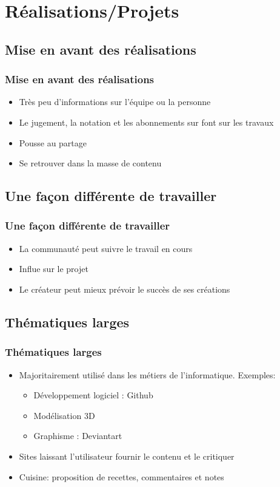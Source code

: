     \section{Réalisations/Projets}

\subsection{Mise en avant des réalisations}
\begin{frame}
\frametitle{Mise en avant des réalisations}
\begin{itemize}
    \itemsep1.5em
    \item Très peu d'informations sur l'équipe ou la personne
    \item Le jugement, la notation et les abonnements sur font sur les travaux
    \item Pousse au partage
    \item Se retrouver dans la masse de contenu
\end{itemize}
\end{frame}

\subsection{Une façon différente de travailler}
\begin{frame}
\frametitle{Une façon différente de travailler}
\begin{itemize}
    \itemsep2em
    \item La communauté peut suivre le travail en cours
    \item Influe sur le projet
    \item Le créateur peut mieux prévoir le succès de ses créations
\end{itemize}
\end{frame}

\subsection{Thématiques larges}
\begin{frame}
\frametitle{Thématiques larges}
\begin{itemize}
    \itemsep1.5em
    \item Majoritairement utilisé dans les métiers de l'informatique. Exemples:
        \begin{itemize}
            \itemsep0.3em
            \item Développement logiciel : Github
            \item Modélisation 3D
            \item Graphisme : Deviantart
        \end{itemize}
    \item Sites laissant l'utilisateur fournir le contenu et le critiquer
    \item Cuisine: proposition de recettes, commentaires et notes
\end{itemize}
\end{frame}
